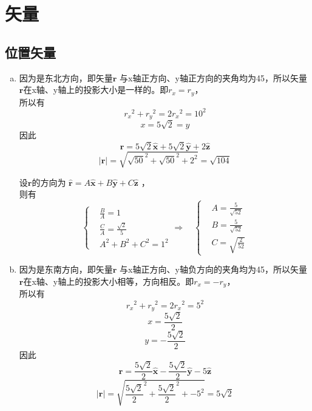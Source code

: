 

\section{矢量}

\subsection{位置矢量}
\begin{enumerate}[(a)]
	\item
	因为是东北方向，即矢量$\bm{r}$ 与x轴正方向、y轴正方向的夹角均为45\degree，所以矢量$\bm{r}$在x轴、y轴上的投影大小是一样的。即$r_x = r_y$，\\
所以有
		$$ {r_x}^2 + {r_y}^2 = 2 {r_x}^2 = 10^2 $$
		$$  x = 5\sqrt{2} = y $$
因此
		$$ \bm{r} = 5 \sqrt{2} \hat{\bm{x}} + 5 \sqrt{2} \hat{\bm{y}} + 2 \hat{\bm{z}} $$
		$$ \lvert{\bm{r}}\rvert = \sqrt{\sqrt{50}^2 + \sqrt{50}^2 + 2^2} = \sqrt{104} $$
		
		设$\bm{r} $的方向为 $ \hat{\bm{r}} = A\hat{\bm{x}} + B\hat{\bm{y}} + C\hat{\bm{z}} $ ，\\
		则有
		\[
		 \left\{
		 \begin{aligned}
		&\frac{B}{A} = 1 \\
		&\frac{C}{A} = \frac{\sqrt{2}}{5} \\
		&A^2+B^2+C^2 = 1^2
		 \end{aligned}
		 \right.
		 \Rightarrow \quad
		\left\{
		 \begin{aligned}
		&A = \frac{5}{\sqrt{52}} \\
		&B = \frac{5}{\sqrt{52}} \\
		&C = \sqrt{\frac{2}{52}}
		 \end{aligned}
		 \right.
		\]


	\item
	因为是东南方向，即矢量$\bm{r}$ 与x轴正方向、y轴负方向的夹角均为45\degree，所以矢量$\bm{r}$在x轴、y轴上的投影大小相等，方向相反。即$r_x = -r_y$，\\
所以有
		$$ {r_x}^2 + {r_y}^2 = 2 {r_x}^2 = 5^2 $$
		$$  x = \frac{5\sqrt{2}}{2} $$
		$$  y = -\frac{5\sqrt{2}}{2} $$
因此
		$$ \bm{r} =\frac{5\sqrt{2}}{2} \hat{\bm{x}} -\frac{5\sqrt{2}}{2} \hat{\bm{y}} - 5 \hat{\bm{z}} $$
		$$ \lvert{\bm{r}}\rvert = \sqrt{{\frac{5\sqrt{2}}{2}}^2 +{\frac{5\sqrt{2}}{2}}^2 + {-5}^2} = 5\sqrt{2} $$
		

\end{enumerate}
